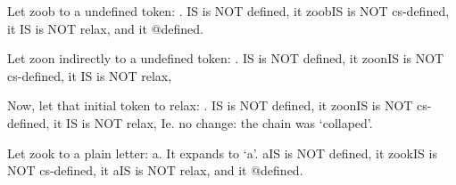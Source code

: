 \documentclass{article}
\begin{document}
\let\zoob\zelda
Let zoob to a undefined token: \meaning\zoob.
\ifdefined\zoob IS \else is NOT \fi defined,
it \ifcsname zoob\endcsname IS \else is NOT \fi cs-defined,
it \ifx\zoob\relax IS \else is NOT \fi relax,
and it  @defined.

\let\two\one
\let\three\two
\let\four\three
\let\zoon\four
Let zoon indirectly to a undefined token: \meaning \zoon.
\ifdefined\zoon IS \else is NOT \fi defined,
it \ifcsname zoon\endcsname IS \else is NOT \fi cs-defined,
it \ifx\zoon\relax IS \else is NOT \fi relax,

\let\one\relax
Now, let that initial token to relax: \meaning \zoon.
\ifdefined\zoon IS \else is NOT \fi defined,
it \ifcsname zoon\endcsname IS \else is NOT \fi cs-defined,
it \ifx\zoon\relax IS \else is NOT \fi relax,
Ie. no change: the chain was `collaped'.

\let\zook=a
Let zook to a plain letter: \meaning\zook.
It expands to `\zook'.
\ifdefined\zook IS \else is NOT \fi defined,
it \ifcsname zook\endcsname IS \else is NOT \fi cs-defined,
it \ifx\zook\relax IS \else is NOT \fi relax,
and it  @defined.
\end{document}

